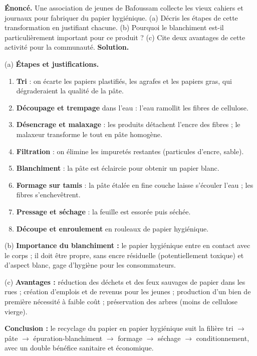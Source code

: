 \documentclass[11pt]{article}
\begin{document}
\begin{exoresolu}
\textbf{Énoncé.} Une association de jeunes de Bafoussam collecte les vieux cahiers et journaux pour fabriquer du papier hygiénique. (a) Décris les étapes de cette transformation en justifiant chacune. (b) Pourquoi le blanchiment est-il particulièrement important pour ce produit ? (c) Cite deux avantages de cette activité pour la communauté.
\tcblower
\textbf{Solution.}

(a) \textbf{Étapes et justifications.}
\begin{enumerate}
\item \textbf{Tri} : on écarte les papiers plastifiés, les agrafes et les papiers gras, qui dégraderaient la qualité de la pâte.
\item \textbf{Découpage et trempage} dans l'eau : l'eau ramollit les fibres de cellulose.
\item \textbf{Désencrage et malaxage} : les produits détachent l'encre des fibres ; le malaxeur transforme le tout en pâte homogène.
\item \textbf{Filtration} : on élimine les impuretés restantes (particules d'encre, sable).
\item \textbf{Blanchiment} : la pâte est éclaircie pour obtenir un papier blanc.
\item \textbf{Formage sur tamis} : la pâte étalée en fine couche laisse s'écouler l'eau ; les fibres s'enchevêtrent.
\item \textbf{Pressage et séchage} : la feuille est essorée puis séchée.
\item \textbf{Découpe et enroulement} en rouleaux de papier hygiénique.
\end{enumerate}

(b) \textbf{Importance du blanchiment :} le papier hygiénique entre en contact avec le corps ; il doit être propre, sans encre résiduelle (potentiellement toxique) et d'aspect blanc, gage d'hygiène pour les consommateurs.

(c) \textbf{Avantages :} réduction des déchets et des feux sauvages de papier dans les rues ; création d'emplois et de revenus pour les jeunes ; production d'un bien de première nécessité à faible coût ; préservation des arbres (moins de cellulose vierge).

\textbf{Conclusion :} le recyclage du papier en papier hygiénique suit la filière tri $\rightarrow$ pâte $\rightarrow$ épuration-blanchiment $\rightarrow$ formage $\rightarrow$ séchage $\rightarrow$ conditionnement, avec un double bénéfice sanitaire et économique.
\end{exoresolu}
\end{document}
